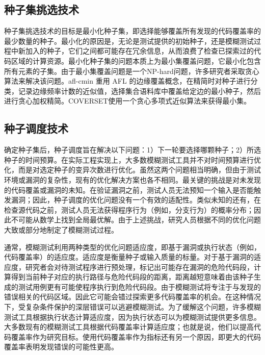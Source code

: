 \documentclass[master]{thesis-uestc}
\begin{document}
\subsection{种子集挑选技术}


种子集挑选技术的目标是最小化种子集，即选择能够覆盖所有发现的代码覆盖率的最少数量的种子。最小化的原因是，无论是测试提供的初始种子，还是模糊测试过程中新加入的种子，它们之间都可能存在冗余信息，从而浪费了检查已探索过的代码区域的计算资源。最小化种子集的问题本质上为最小集覆盖问题，它最小化包含所有元素的子集。由于最小集覆盖问题是一个NP-hard问题，许多研究者采取贪心算法来解决该问题。afl-cmin 重用 AFL 的边缘覆盖概念，在精简时对种子进行分类，记录边缘频率计数的近似值，选择集合语料库中覆盖给定边的最小种子，然后进行贪心加权精简。COVERSET使用一个贪心多项式近似算法来获得最小集。

\subsection{种子调度技术}

确定种子集后，种子调度旨在解决以下问题：1）下一轮要选择哪颗种子；2）所选种子的时间预算。在实际工程实现上，大多数模糊测试工具并不对时间预算进行优化，而是对选定种子的变异次数进行优化。虽然这两个问题相当明确，但由于测试环境或漏洞的复杂性，现有的优化解决方案也各不相同。最关键的挑战是对未发现的代码覆盖或漏洞的未知。在验证漏洞之前，测试人员无法预知一个输入是否能触发漏洞；因此，种子调度的优化问题没有一个有效的适配性。类似未知的还有，在检查源代码之前，测试人员无法获得程序行为（例如，分支行为）的概率分布；因此不可能从数学上找到全局最优解。由于上述挑战，研究人员根据不同的优化问题大致或部分地制定了模糊测试过程。

通常，模糊测试利用两种类型的优化问题适应度，即基于漏洞或执行状态（例如，代码覆盖率）的适应度。适应度是衡量种子或输入质量的标量。对于基于漏洞的适应度，研究者会对待测试程序进行预处理，标记出可能存在漏洞的危险代码段，计算得到当前种子对应的执行路径与危险代码段的距离，距离越短意味着由该种子生成的测试用例更有可能使程序执行到危险代码段。由于模糊测试将专注于与发现的错误相关的代码区域。因此它可能会错过探索更多代码覆盖率的机会。在这种情况下，受复杂条件保护的深层错误可以逃避模糊测试。为了缓解这个问题，许多模糊测试工具根据执行状态计算适应度，因为执行状态可以为模糊测试提供更多信息。大多数现有的模糊测试工具根据代码覆盖率计算适应度；也就是说，他们以提高代码覆盖率作为研究目标。使用代码覆盖率作为指标还有另一个原因，即更大的代码覆盖率表明发现错误的可能性更高。
\end{document}
